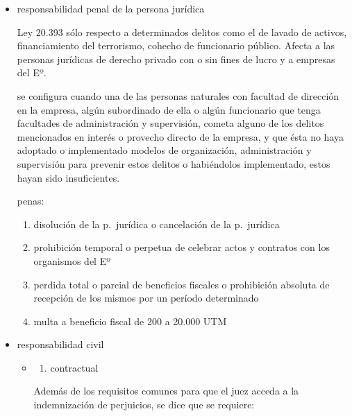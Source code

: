 \documentclass[]{article}
\providecommand{\tightlist}{%
  \setlength{\itemsep}{0pt}\setlength{\parskip}{0pt}}
\begin{document}
\begin{itemize}
\begin{itemize}
\begin{itemize}
\begin{itemize}
        \begin{itemize}
        \item
          responsabilidad penal de la persona jurídica

          Ley 20.393 sólo respecto a determinados delitos como el de
          lavado de activos, financiamiento del terrorismo, cohecho de
          funcionario público. Afecta a las personas jurídicas de
          derecho privado con o sin fines de lucro y a empresas del Eº.

          se configura cuando una de las personas naturales con facultad
          de dirección en la empresa, algún subordinado de ella o algún
          funcionario que tenga facultades de administración y
          supervisión, cometa alguno de los delitos mencionados en
          interés o provecho directo de la empresa, y que ésta no haya
          adoptado o implementado modelos de organización,
          administración y supervisión para prevenir estos delitos o
          habiéndolos implementado, estos hayan sido insuficientes.

          penas:

          \begin{enumerate}
          \def\labelenumi{\arabic{enumi}.}
          \tightlist
          \item
            disolución de la p.~jurídica o cancelación de la p.~jurídica
          \item
            prohibición temporal o perpetua de celebrar actos y
            contratos con los organismos del Eº
          \item
            perdida total o parcial de beneficios fiscales o prohibición
            absoluta de recepción de los mismos por un período
            determinado
          \item
            multa a beneficio fiscal de 200 a 20.000 UTM
          \end{enumerate}
        \item
          responsabilidad civil

          \begin{itemize}
          \item
            \begin{enumerate}
            \def\labelenumi{\alph{enumi})}
            \tightlist
            \item
              contractual
            \end{enumerate}

            Además de los requisitos comunes para que el juez acceda a
            la indemnización de perjuicios, se dice que se requiere:


\end{itemize}
\end{itemize}
\end{itemize}
\end{itemize}
\end{itemize}
\end{itemize}
\end{document}
